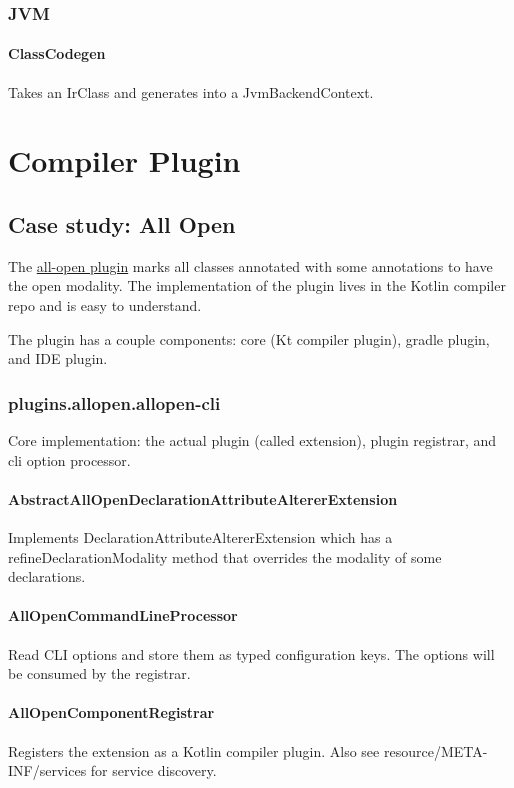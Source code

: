 \documentclass{article}
\begin{document}
\subsubsection{JVM}

\paragraph{ClassCodegen}
Takes an IrClass and generates into a JvmBackendContext.

\section{Compiler Plugin}

\subsection{Case study: All Open}

The \href{https://kotlinlang.org/docs/reference/compiler-plugins.html}{all-open plugin} marks all classes annotated with some annotations to have the open modality. The implementation of the plugin lives in the Kotlin compiler repo and is easy to understand.

The plugin has a couple components: core (Kt compiler plugin), gradle plugin, and IDE plugin.

\subsubsection{plugins.allopen.allopen-cli}

Core implementation: the actual plugin (called extension), plugin registrar, and cli option processor.

\paragraph{AbstractAllOpenDeclarationAttributeAltererExtension} Implements DeclarationAttributeAltererExtension which has a refineDeclarationModality method that overrides the modality of some declarations.

\paragraph{AllOpenCommandLineProcessor} Read CLI options and store them as typed configuration keys. The options will be consumed by the registrar.

\paragraph{AllOpenComponentRegistrar} Registers the extension as a Kotlin compiler plugin. Also see resource/META-INF/services for service discovery.
\end{document}
